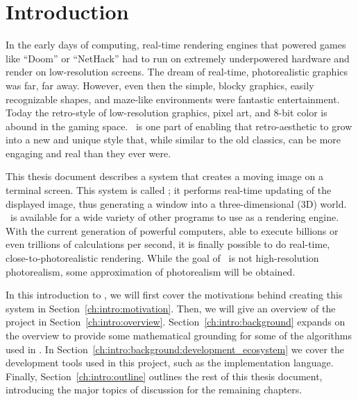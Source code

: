 %
%

\chapter{Introduction}
\label{ch:intro}

In the early days of computing, real-time rendering engines that powered games like ``Doom'' or ``NetHack'' had to run on extremely underpowered hardware and render on low-resolution screens.
The dream of real-time, photorealistic graphics was far, far away.
However, even then the simple, blocky graphics, easily recognizable shapes, and maze-like environments were fantastic entertainment.
Today the retro-style of low-resolution graphics, pixel art, and 8-bit color is abound in the gaming space.
\name\ is one part of enabling that retro-aesthetic to grow into a new and unique style that, while similar to the old classics, can be more engaging and real than they ever were.

This thesis document describes a system that creates a moving image on a terminal screen.
This system is called \name; it performs real-time updating of the displayed image, thus generating a window into a three-dimensional (3D) world.
\name\ is available for a wide variety of other programs to use as a rendering engine.
With the current generation of powerful computers, able to execute billions or even trillions of calculations per second, it is finally possible to do real-time, close-to-photorealistic rendering.
While the goal of \name\ is not high-resolution photorealism, some approximation of photorealism will be obtained.

In this introduction to \name, we will first cover the motivations behind creating this system in Section~\ref{ch:intro:motivation}.
Then, we will give an overview of the project in Section~\ref{ch:intro:overview}.
Section~\ref{ch:intro:background} expands on the overview to provide some mathematical grounding for some of the algorithms used in \name.
In Section~\ref{ch:intro:background:development_ecosystem} we cover the development tools used in this project, such as the implementation language.
Finally, Section~\ref{ch:intro:outline} outlines the rest of this thesis document, introducing the major topics of discussion for the remaining chapters.

